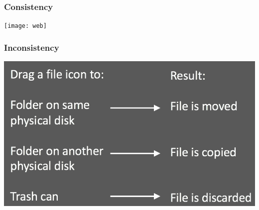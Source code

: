 \documentclass{beamer}
\begin{document}
\begin{frame}
\frametitle{Consistency}
\centering
\texttt{[image: web]}
\end{frame}


\begin{frame}
\frametitle{Inconsistency}
\centering
\includegraphics[width=0.9\linewidth]{consistent6}
\end{frame}

%

\end{document}
